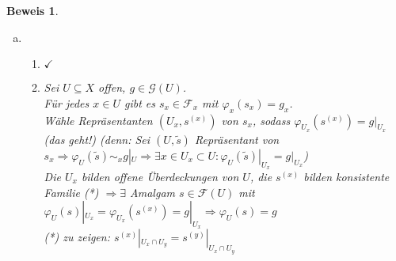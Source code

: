 \documentclass[paper = A4, fontsize=12pt, numbers=noendperiod, chapterprefix=true]{scrbook}
\theoremstyle{break}
\theoremstyle{nonumberbreak}
\newtheorem{bsp}{Beispiel}
\newtheorem{bew}{Beweis}
\theoremstyle{nonumberplain}
\newcommand{\quot}[1]{\textrm{\glqq}{#1}\textrm{\grqq}}
\newenvironment{twosidedproof}{\begin{enumerate}[\quot{$\Rightarrow$}:]}{\end{enumerate}}
\newcommand{\proofforward}{\item[\quot{$\Rightarrow$}:]}
\newcommand{\proofreverse}{\item[\quot{$\Leftarrow$}:]}
\DeclareMathOperator{\Off}{Off}
\newcommand{\C}{\mathbb{C}}
\newcommand{\calF}{\mathcal{F}}
\newcommand{\calG}{\mathcal{G}}
\newcommand{\calO}{\mathcal{O}}
\newcommand{\X}{\times}
\begin{document}
\begin{bew}
\begin{enumerate}[a)]
\begin{twosidedproof}
\begin{center}
\end{center}
  \end{twosidedproof}
  \begin{bsp}
  Sei $X = \C$, $\calO$ die Garbe der holomorphen Funktionen auf $\C$, $\calO^\X$ die Garbe der invertierbaren holomorphen Funktionen.\\
  $\varphi = \exp$, das hei\ss t f\"ur $f\in \calO(U)$ sei $\varphi(f) = e^{2\pi if}$.\\
  $\varphi$ ist Garbenhomomorphisms ($e^{f+g} = e^f \cdot e^g$). $\varphi_x$ ist surjektiv f\"ur jedes $x\in X$ (lokal gibt es zu jeder holomorphen Funktion ohne Nullstellen einen Logarithmus). $\varphi_{\C\setminus\{0\}}$ ist nicht surjektiv! (zum Beispiel gibt es keine holomorphe Funktion $\log z$ auf ganz $\C$)\\
  Schlimmer noch: $\varphi_U$ ist nicht injektiv f\"ur jedes $U \in \Off(\C)$, das nicht einfach zusammenh\"angend ist.
  \end{bsp}
\item
  \begin{twosidedproof}
  \proofforward
    $\checkmark$
  \proofreverse
    Sei $U\subseteq X$ offen, $g\in \calG(U)$.\\
    F\"ur jedes $x\in U$ gibt es $s_x\in \calF_x$ mit $\varphi_x(s_x) = g_x$.\\
    W\"ahle Repr\"asentanten $(U_x, s^{(x)})$ von $s_x$, sodass $\varphi_{U_x}(s^{(x)}) = g|_{U_x}$ (das geht!) (\emph{denn}: Sei $(U,\tilde s)$ Repr\"asentant von $s_x \Rightarrow \varphi_U(\tilde s)\sim_x g|_U \Rightarrow \exists x \in U_x \subset U: \varphi_U(\tilde s)|_{U_x} = g|_{U_x}$)\\
    Die $U_x$ bilden offene \"Uberdeckungen von $U$, die $s^{(x)}$ bilden konsistente Familie (*) $\Rightarrow \exists$ Amalgam $s\in \calF(U)$ mit $\varphi_U(s)|_{U_x} = \varphi_{U_x}(s^{(x)}) = g|_{U_x} \Rightarrow \varphi_U(s) = g$\\
    (*) zu zeigen: $s^{(x)}|_{U_x\cap U_y} = s^{(y)}|_{U_x\cap U_y}$
  \end{twosidedproof}
\end{enumerate}\end{bew}
\end{document}
